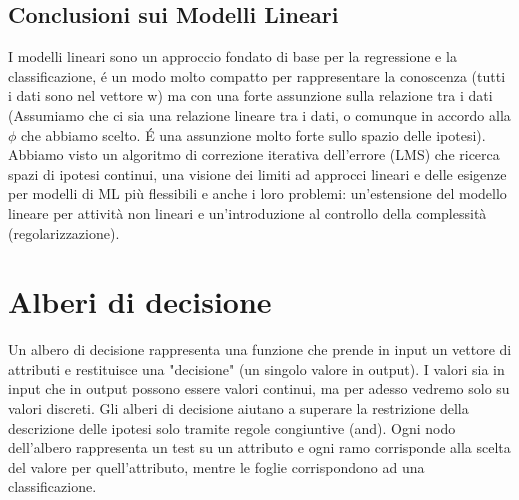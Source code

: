 \documentclass{article}
\begin{document}
\subsection{Conclusioni sui Modelli Lineari}
I modelli lineari sono un approccio fondato di base per la regressione e la classificazione, é un modo molto compatto per rappresentare la conoscenza (tutti i dati sono nel vettore w) ma con una forte assunzione sulla relazione tra i dati (Assumiamo che ci sia una relazione lineare tra i dati, o comunque in accordo alla $\phi$ che abbiamo scelto. É una assunzione molto forte sullo spazio delle ipotesi). Abbiamo visto un algoritmo di correzione iterativa dell'errore (LMS) che ricerca spazi di ipotesi continui, una visione dei limiti ad approcci lineari e delle esigenze per modelli di ML più flessibili e anche i loro problemi: un'estensione del modello lineare per attività non lineari e un'introduzione al controllo della complessità (regolarizzazione).
\clearpage

\section{Alberi di decisione}
Un albero di decisione rappresenta una funzione che prende in input un vettore di attributi e restituisce una "decisione" (un singolo valore in output). I valori sia in input che in output possono essere valori continui, ma per adesso vedremo solo su valori discreti. Gli alberi di decisione aiutano a superare la restrizione della descrizione delle ipotesi solo tramite regole congiuntive (and). Ogni nodo dell'albero rappresenta un test su un attributo e ogni ramo corrisponde alla scelta del valore per quell'attributo, mentre le foglie corrispondono ad una classificazione. 
\end{document}

